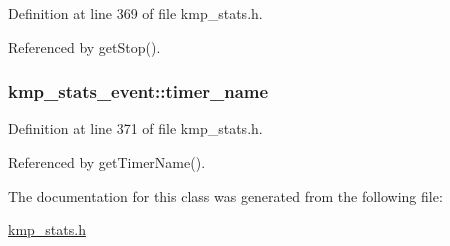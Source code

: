 Definition at line 369 of file kmp\-\_\-stats.\-h.



Referenced by get\-Stop().

\hypertarget{classkmp__stats__event_afd16631d13a4b9a3bcf40e758c182c8b}{
\subsubsection[{timer\-\_\-name}]{ kmp\-\_\-stats\-\_\-event\-::timer\-\_\-name\hspace{0.3cm}{\ttfamily [private]}}}\label{classkmp__stats__event_afd16631d13a4b9a3bcf40e758c182c8b}


Definition at line 371 of file kmp\-\_\-stats.\-h.



Referenced by get\-Timer\-Name().



The documentation for this class was generated from the following file\-:\begin{DoxyCompactItemize}
\item 
\hyperlink{kmp__stats_8h}{kmp\-\_\-stats.\-h}\end{DoxyCompactItemize}
